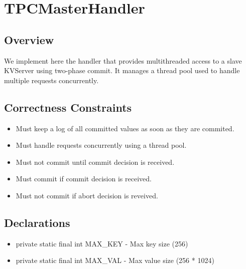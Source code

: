 \section{TPCMasterHandler}
\subsection{Overview}
We implement here the handler that provides multithreaded access to a slave KVServer using two-phase commit. It manages a thread pool used to handle multiple requests concurrently.
\subsection{Correctness Constraints}
\begin{itemize}
\item Must keep a log of all committed values as soon as they are commited.
\item Must handle requests concurrently using a thread pool.
\item Must not commit until commit decision is received.
\item Must commit if commit decision is received.
\item Must not commit if abort decision is reveived.
\end{itemize}
\subsection{Declarations}
\begin{itemize}
\item{\ttfamily private static final int MAX\_KEY} - Max key size (256)
\item{\ttfamily private static final int MAX\_VAL} - Max value size (256 * 1024)
\end{itemize}
